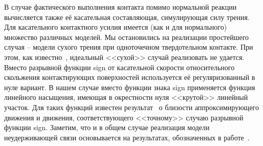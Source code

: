 В случае фактического выполнения контакта помимо нормальной реакции вычисляется
также её касательная составляющая, симулирующая силу трения. Для касательного 
контактного усилия имеется (как и для нормального) множество различных моделей. 
Мы остановились на реализации простейшего случая -- модели сухого трения при 
одноточечном твердотельном контакте. При этом, как известно~\cite{Novozhilov1991}, 
идеальный <<сухой>> случай реализовать не удается. Вместо разрывной функции 
sign от касательной скорости относительного скольжения контактирующих 
поверхностей используется её регуляризованный в нуле вариант. В нашем случае 
вместо функции знака sign применяется функция линейного насыщения, имеющая в 
окрестности нуля <<крутой>> линейный участок. Для таких функций известен 
результат~\cite{Novozhilov1991} о близости аппроксимирующего движения и движения, соответствующего <<точному>> случаю разрывной функции sign. Заметим, что и в общем случае реализация модели 
неудерживающей связи основывается на результатах, обозначенных в 
работе~\cite{Kosenko2006unilat}.